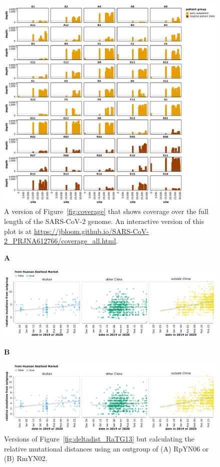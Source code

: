 \documentclass[9pt,twocolumn,twoside]{gsajnl_modified}
\begin{document}
\begin{figure}[h!]
\centering
\includegraphics[width=\linewidth]{figures/coverage_all.pdf}
\caption{A version of Figure~\ref{fig:coverage} that shows coverage over the full length of the SARS-CoV-2 genome.
An interactive version of this plot is at \url{https://jbloom.github.io/SARS-CoV-2_PRJNA612766/coverage_all.html}.
}
\label{suppfig:coverage_all}
\end{figure}

\begin{figure}[h!]
{\bf \LARGE A} \\
\centerline{\includegraphics[width=\linewidth]{figures/deltadist_RpYN06.pdf}}
{\bf \LARGE B} \\
\centerline{\includegraphics[width=\linewidth]{figures/deltadist_RmYN02.pdf}}
\caption{Versions of Figure~\ref{fig:deltadist_RaTG13} but calculating the relative mutational distances using an outgroup of (A) RpYN06 or (B) RmYN02.
}
\label{suppfig:deltadist_RpYN06_RmYN02}
\end{figure}
\end{document}
